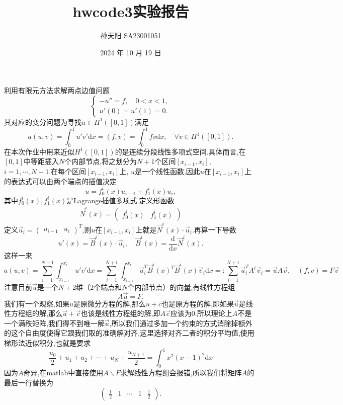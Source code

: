 \documentclass{article}
\title{hwcode3实验报告}
\author{孙天阳 SA23001051}
\begin{document}
\date{2024 年 10 月 19 日}
\maketitle

利用有限元方法求解两点边值问题
\[
\begin{cases}
-u'' = f, \quad 0 < x < 1,\\
u'(0) = u'(1) = 0.
\end{cases}
\]
其对应的变分问题为寻找$ u\in H^1([0,1]) $满足
\[a(u,v)=\int_0^1u'v'\mathrm{d} x=(f,v)=\int_0^1fv\mathrm{d} x,\quad \forall v\in H^1([0,1]).\]
在本次作业中用来近似$ H^1([0,1]) $的是连续分段线性多项式空间.具体而言,在$ [0,1] $中等距插入$ N $个内部节点,将之划分为$ N+1 $个区间$ [x_{i-1},x_{i}] $, $ i=1,\cdots,N+1 $.在每个区间$ [x_{i-1},x_{i}] $上, $ u $是一个线性函数,因此$ u $在$ [x_{i-1},x_{i}] $上的表达式可以由两个端点的插值决定
\[u=f^i_0(x)u_{i-1}+f^i_{1}(x)u_i,\]
其中$ f^i_0(x),f^i_{1}(x) $是Lagrange插值多项式.定义形函数
\[\vec{N}^i(x)=\begin{pmatrix}f_0^i(x)&f_1^i(x)\end{pmatrix}\]
定义$ \vec{u}_i=\begin{pmatrix}u_{i-1}&u_{i}\end{pmatrix}^T $,则$ u $在$ [x_{i-1},x_i] $上就是$ \vec{N}^i(x)\cdot \vec{u}_i $.再算一下导数
\[u'(x)=\vec{B}^i(x)\cdot \vec{u}_i,\quad \vec{B}^i(x)=\frac{\mathrm{d}}{\mathrm{d}x}\vec{N}^i(x).\]
这样一来
\[a(u,v)=\sum_{i=1}^{N+1}\int_{x_{i-1}}^{x_i}u'v'\mathrm{d} x=\sum_{i=1}^{N+1}\int_{x_{i-1}}^{x_i}\vec{u}_i^T\vec{B}^i(x)^T\vec{B}^i(x)\vec{v}_i\mathrm{d} x=:\sum_{i=1}^{N+1}\vec{u}_i^TA^i\vec{v}_i=\vec{u}A\vec{v},\quad (f,v)=F\vec{v}\]
注意目前$ \vec{u} $是一个$ N+2 $维（2个端点和$ N $个内部节点）的向量,有线性方程组
\[A\vec{u}=F.\]
我们有一个观察,如果$ u $是原微分方程的解,那么$ u+c $也是原方程的解,即如果$ \vec{u} $是线性方程组的解,那么$ \vec{u}+\vec{c} $也该是线性方程组的解,即$ A\vec{c} $应该为$ 0 $.所以理论上$ A $不是一个满秩矩阵,我们得不到唯一解$ \vec{u} $,所以我们通过多加一个约束的方式消除掉额外的这个自由度使得它跟我们取的准确解对齐,这里选择对齐二者的积分平均值,使用梯形法近似积分,也就是要求
\[\frac{u_0}{2} + u_1 + u_2 + \cdots + u_N + \frac{u_{N+1}}{2} = \int_0^1x^2(x-1)^2\mathrm{d} x\]
因为$ A $奇异,在matlab中直接使用$ A\backslash F $求解线性方程组会报错,所以我们将矩阵$ A $的最后一行替换为
\[\begin{pmatrix}\frac{1}{2}&1&\cdots&1&\frac{1}{2}\end{pmatrix}.\]
\end{document}
